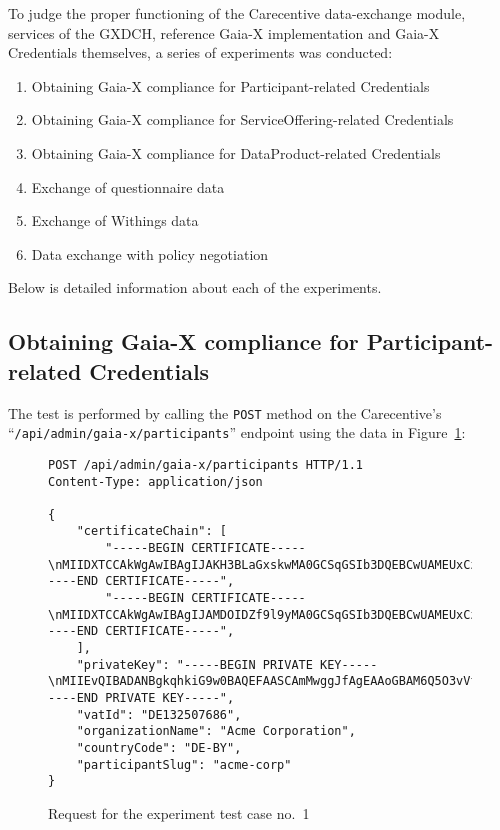 To judge the proper functioning of the Carecentive data-exchange module, services of the GXDCH, reference Gaia-X implementation and Gaia-X Credentials themselves, a series of experiments was conducted:
\begin{enumerate}
    \item Obtaining Gaia-X compliance for Participant-related Credentials
    \item Obtaining Gaia-X compliance for ServiceOffering-related Credentials
    \item Obtaining Gaia-X compliance for DataProduct-related Credentials
    \item Exchange of questionnaire data
    \item Exchange of Withings data
    \item Data exchange with policy negotiation
\end{enumerate}

Below is detailed information about each of the experiments.

\subsection{Obtaining Gaia-X compliance for Participant-related Credentials}\label{subsec:participant-compliance}

The test is performed by calling the \texttt{POST} method on the Carecentive's ``\texttt{/api/admin/gaia-x/participants}'' endpoint using the data in Figure~\ref{fig:test_case_1}:

\begin{figure}[h]
    \centering
    \begin{verbatim}
POST /api/admin/gaia-x/participants HTTP/1.1
Content-Type: application/json

{
	"certificateChain": [
		"-----BEGIN CERTIFICATE-----\nMIIDXTCCAkWgAwIBAgIJAKH3BLaGxskwMA0GCSqGSIb3DQEBCwUAMEUxCzAJBgNV\n...\nJmCVzwB/MCuv3z4IV0IsbP5ZKh+6m0oI+RINdDl4Stxdj6LK8JspNeU0R6mBg1A=\n-----END CERTIFICATE-----",
		"-----BEGIN CERTIFICATE-----\nMIIDXTCCAkWgAwIBAgIJAMDOIDZf9l9yMA0GCSqGSIb3DQEBCwUAMEUxCzAJBgNV\n...\nv5pXVIlZm8DtRmDTUp8pNDnQ5UAZTuDPaWo3zbxZPOUmGJ1IlBOgaQvsyPCW5gU=\n-----END CERTIFICATE-----",
	],
	"privateKey": "-----BEGIN PRIVATE KEY-----\nMIIEvQIBADANBgkqhkiG9w0BAQEFAASCAmMwggJfAgEAAoGBAM6Q5O3vVfnxk6P7\n...\nYWw+HiFJh9XQpRUtv9PV8L8AqFFfMdsOpT6pgC+aA/WB\n-----END PRIVATE KEY-----",
	"vatId": "DE132507686",
	"organizationName": "Acme Corporation",
	"countryCode": "DE-BY",
	"participantSlug": "acme-corp"
}
    \end{verbatim}
    \caption{Request for the experiment test case no.~1}\label{fig:test_case_1}
\end{figure}

